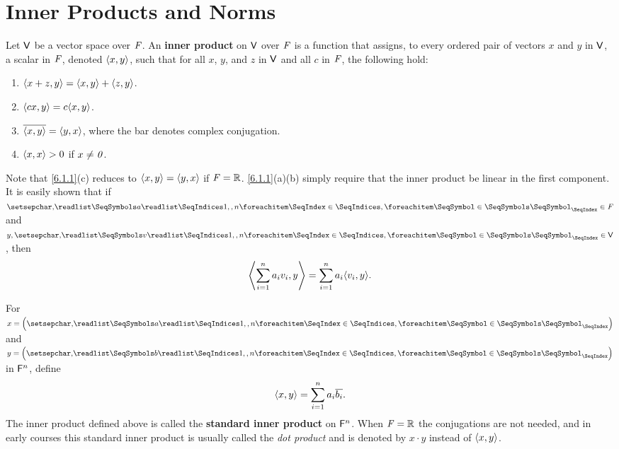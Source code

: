\section{Inner Products and Norms}\label{sec:6.1}

\begin{defn}\label{6.1.1}
	Let \(\mathsf{V}\) be a vector space over \(\mathit{F}\).
	An \textbf{inner product} on \(\mathsf{V}\) over \(\mathit{F}\) is a function that assigns, to every ordered pair of vectors \(x\) and \(y\) in \(\mathsf{V}\), a scalar in \(\mathit{F}\), denoted \(\left\langle x, y\right\rangle\), such that for all \(x\), \(y\), and \(z\) in \(\mathsf{V}\) and all \(c\) in \(\mathit{F}\), the following hold:
	\begin{enumerate}
		\item \(\left\langle x + z, y\right\rangle = \left\langle x, y\right\rangle + \left\langle z, y\right\rangle\).
		\item \(\inn{cx, y} = c \inn{x, y}\).
		\item \(\overline{\left\langle x, y\right\rangle} = \left\langle y, x\right\rangle\), where the bar denotes complex conjugation.
		\item \(\left\langle x, x\right\rangle > 0\) if \(x \neq \mathit{0}\).
	\end{enumerate}
\end{defn}

\begin{note}
	Note that \cref{6.1.1}(c) reduces to \(\left\langle x, y\right\rangle = \left\langle y, x\right\rangle\) if \(\mathit{F} = \mathbb{R}\).
	\cref{6.1.1}(a)(b) simply require that the inner product be linear in the first component.
	It is easily shown that if \(\seq{a}{1,,n} \in \F\) and \(y, \seq{v}{1,,n} \in \V\), then
	\[
		\inn{\sum_{i = 1}^n a_i v_i, y} = \sum_{i = 1}^n a_i \inn{v_i, y}.
	\]
\end{note}

\begin{eg}\label{6.1.2}
	For \(x = \tuple{a}{1,,n}\) and \(y = \tuple{b}{1,,n}\) in \(\mathsf{F}^n\), define
	\[
		\left\langle x, y\right\rangle = \sum_{i = 1}^n a_i \overline{b_i}.
	\]
	The inner product defined above is called the \textbf{standard inner product} on \(\mathsf{F}^n\).
	When \(\mathit{F} = \mathbb{R}\) the conjugations are not needed, and in early courses this standard inner product is usually called the \emph{dot product} and is denoted by \(x \cdot y\) instead of \(\left\langle x, y\right\rangle\).
\end{eg}

